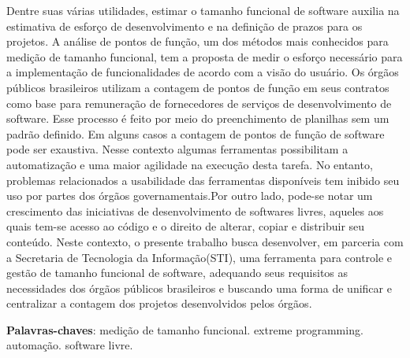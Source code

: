\begin{resumo}
  Dentre suas várias utilidades, estimar o tamanho funcional de software auxilia na estimativa de esforço de desenvolvimento e na definição de prazos para os projetos. A análise de pontos de função, um dos métodos mais conhecidos para medição de tamanho funcional, tem a proposta de medir o esforço necessário para a implementação de funcionalidades de acordo com a visão do usuário. Os órgãos públicos brasileiros utilizam a contagem de pontos de função em seus contratos como base para remuneração de fornecedores de serviços de desenvolvimento de software. Esse processo é feito por meio do preenchimento de planilhas sem um padrão definido. Em alguns casos a contagem de pontos de função de software pode ser exaustiva. Nesse contexto algumas ferramentas possibilitam a automatização e uma maior agilidade na execução desta tarefa. No entanto, problemas relacionados a usabilidade das ferramentas disponíveis tem inibido seu uso por partes dos órgãos governamentais.Por outro lado, pode-se notar um crescimento das iniciativas de desenvolvimento de softwares livres, aqueles aos quais tem-se acesso ao código e o direito de alterar, copiar e distribuir seu conteúdo.  Neste contexto, o presente trabalho busca desenvolver, em parceria com a Secretaria de Tecnologia da Informação(STI), uma ferramenta para controle e gestão de tamanho funcional de software, adequando seus requisitos as necessidades dos órgãos públicos brasileiros e buscando uma forma de unificar e centralizar a contagem dos projetos desenvolvidos pelos órgãos.

 \vspace{\onelineskip}

 \noindent
 \textbf{Palavras-chaves}: medição de tamanho funcional. extreme programming. automação. software livre.
\end{resumo}
